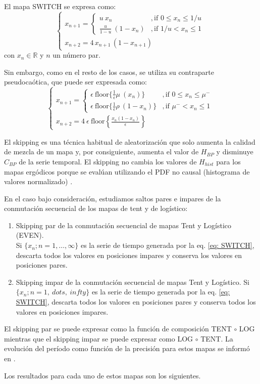 El mapa SWITCH se expresa como:
%
\begin{equation}\label{eq:SWITCH}
\begin{cases}
x_{n+1}=
\begin{cases}
u~x_n &, \textrm{if } 0\leq x_n\leq 1/u\\
\frac{u}{1-u}~(1-x_n) &, \textrm{if } 1/u< x_n\leq 1 
\end{cases} \\
x_{n+2}=4\,x_{n+1}\,(1-x_{n+1})
\end{cases}
\end{equation}
%
con $x_n \in \mathbb{R}$ y $n$ un número par.

Sin embargo, como en el resto de los casos, se utiliza su contraparte pseudocaótica, que puede ser expresada como:
%
\begin{equation}\label{eq:SWITCHB2}
\begin{cases}
x_{n+1}=
\begin{cases}
\epsilon ~\text{floor} \{\frac{1}{\epsilon} \mu~(x_n)\} &, \textrm{if } 0\leq x_n\leq \mu^-\\
\epsilon ~\text{floor} \{\frac{1}{\epsilon} \rho~(1-x_n)\} &, \textrm{if } \mu^-<x_n\leq 1
\end{cases} \\
x_{n+2}=4 ~\epsilon ~\text{floor}\left\{\frac{x_n(1-x_n)}{\epsilon}\right\}
\end{cases}
\end{equation}

El skipping es una técnica habitual de aleatorización que solo aumenta la calidad de mezcla de un mapa y, por consiguiente, aumenta el valor de $H_{BP}$ y disminuye $C_{BP}$ de la serie temporal.
El skipping no cambia los valores de $H_{hist}$ para los mapas ergódicos porque se evalúan utilizando el PDF no causal (histograma de valores normalizado) \cite{DeMicco2008}.

En el caso bajo consideración, estudiamos saltos pares e impares de la conmutación secuencial de los mapas de tent y de logístico:
\begin{enumerate}
	\item Skipping par de la conmutación secuencial de mapas Tent y Logístico (EVEN). \\
	Si $\{x_n; n = 1, \dots, \infty \}$ es la serie de tiempo generada por la eq. \ref{eq: SWITCH}, descarta todos los valores en posiciones impares y conserva los valores en posiciones pares.
	\item Skipping impar de la conmutación secuencial de mapas Tent y Logístico.
	Si $\{x_n; n = 1, \ dots, \ infty \}$ es la serie de tiempo generada por la eq. \ref{eq: SWITCH}, descarta todos los valores en posiciones pares y conserva todos los valores en posiciones impares.
\end{enumerate}

El skipping par se puede expresar como la función de composición TENT $\circ$ LOG mientras que el skipping impar se puede expresar como LOG $\circ$ TENT.
La evolución del período como función de la precisión para estos mapas se informó en \cite{Nagaraj2008}.

Los resultados para cada uno de estos mapas son los siguientes.